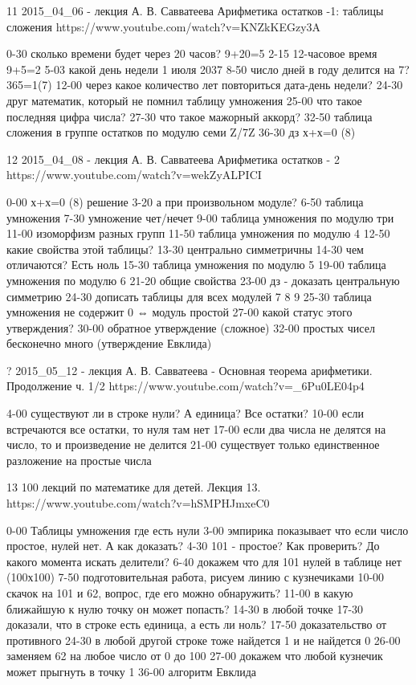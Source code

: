 11
2015_04_06 - лекция А. В. Савватеева Арифметика остатков -1: таблицы сложения
https://www.youtube.com/watch?v=KNZkKEGzy3A

0-30 сколько времени будет через 20 часов? 9+20=5
2-15 12-часовое время 9+5=2
5-03 какой день недели 1 июля 2037
8-50 число дней в году делится на 7? 365=1(7)
12-00 через какое количество лет повториться дата-день недели?
24-30 друг математик, который не помнил таблицу умножения
25-00 что такое последняя цифра числа?
27-30 что такое мажорный аккорд?
32-50 таблица сложения в группе остатков по модулю семи Z/7Z
36-30 дз х+х=0 (8)

12
2015_04_08 - лекция А. В. Савватеева Арифметика остатков - 2
https://www.youtube.com/watch?v=wekZyALPICI

0-00 х+х=0 (8) решение
3-20 а при произвольном модуле?
6-50 таблица умножения
7-30 умножение чет/нечет
9-00 таблица умножения по модулю три
11-00 изоморфизм разных групп 
11-50 таблица умножения по модулю 4
12-50 какие свойства этой таблицы?
13-30 центрально симметричны
14-30 чем отличаются? Есть ноль
15-30 таблица умножения по модулю 5
19-00 таблица умножения по модулю 6
21-20 общие свойства
23-00 дз - доказать центральную симметрию
24-30 дописать таблицы для всех модулей 7 8 9 
25-30 таблица умножения не содержит 0 ⇔ модуль простой
27-00 какой статус этого утверждения?
30-00 обратное утверждение (сложное)
32-00 простых чисел бесконечно много (утверждение Евклида)

?
2015_05_12 - лекция А. В. Савватеева - Основная теорема арифметики. Продолжение ч. 1/2
https://www.youtube.com/watch?v=_6Pu0LE04p4

4-00 существуют ли в строке нули? А единица? Все остатки?
10-00 если встречаются все остатки, то нуля там нет
17-00 если два числа не делятся на число, то и произведение не делится
21-00 существует только единственное разложение на простые числа


13
100 лекций по математике для детей. Лекция 13.
https://www.youtube.com/watch?v=hSMPHJmxeC0

0-00 Таблицы умножения где есть нули
3-00 эмпирика показывает что если число простое, нулей нет. А как доказать?
4-30 101 - простое? Как проверить? До какого момента искать делители?
6-40 докажем что для 101 нулей в таблице нет (100х100)
7-50 подготовительная работа, рисуем линию с кузнечиками
10-00 скачок на 101 и 62, вопрос, где его можно обнаружить?
11-00 в какую ближайшую к нулю точку он может попасть?
14-30 в любой точке
17-30 доказали, что в строке есть единица, а есть ли ноль?
17-50 доказательство от противного
24-30 в любой другой строке тоже найдется 1 и не найдется 0
26-00 заменяем 62 на любое число от 0 до 100
27-00 докажем что любой кузнечик может прыгнуть в точку 1
36-00 алгоритм Евклида

